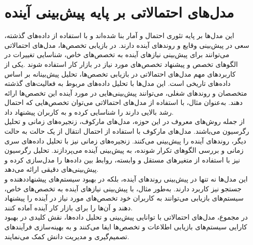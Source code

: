 \section{مدل‌های احتمالاتی بر پایه پیش‌بینی آینده}
\hspace*{2em}
این مدل‌ها بر پایه تئوری احتمال و آمار بنا شده‌اند و با استفاده از داده‌های گذشته، سعی در پیش‌بینی وقایع و روندهای آینده	  دارند. در بازیابی تخصص‌ها، مدل‌های احتمالاتی می‌توانند برای پیش‌بینی نیازهای آینده به تخصص‌های خاص، شناسایی تغییرات در الگوهای تخصص و پیشنهاد تخصص‌های مورد نیاز در بازار کار استفاده شوند .یکی از کاربردهای مهم مدل‌های احتمالاتی در بازیابی تخصص‌ها، تحلیل پیش‌بینانه بر اساس داده‌های تاریخی است. این مدل‌ها با تحلیل داده‌های مربوط به فعالیت‌های گذشته متخصصان و روندهای شغلی، می‌توانند پیش‌بینی‌هایی در مورد آینده این تخصص‌ها ارائه دهند. به‌عنوان مثال، با استفاده از مدل‌های احتمالاتی می‌توان تخصص‌هایی که احتمال رشد بالایی دارند را شناسایی کرده و به کاربران پیشنهاد داد.
\\
از جمله روش‌های معروف در این حوزه، مدل‌های مارکوف، زنجیره‌های زمانی و تحلیل رگرسیون می‌باشند. مدل‌های مارکوف با استفاده از احتمال انتقال از یک حالت به حالت دیگر، روندهای آینده را پیش‌بینی می‌کنند. زنجیره‌های زمانی نیز با تحلیل داده‌های سری زمانی و بررسی الگوهای تکرار شونده، به پیش‌بینی آینده می‌پردازند. تحلیل رگرسیون نیز با استفاده از متغیرهای مستقل و وابسته، روابط بین داده‌ها را مدل‌سازی کرده و پیش‌بینی‌های دقیقی ارائه می‌دهد.
\\
این مدل‌ها نه تنها در پیش‌بینی روندهای آینده، بلکه در بهبود سیستم‌های پیشنهاددهنده و جستجو نیز کاربرد دارند. به‌طور مثال، با پیش‌بینی نیازهای آینده به تخصص‌های خاص، سیستم‌های بازیابی می‌توانند به کاربران خود تخصص‌های مورد نیاز در آینده را پیشنهاد دهند و آن‌ها را برای بازار کار آینده آماده کنند.
\\
در مجموع، مدل‌های احتمالاتی با توانایی پیش‌بینی و تحلیل داده‌ها، نقش کلیدی در بهبود کارایی سیستم‌های بازیابی اطلاعات و تخصص‌ها ایفا می‌کنند و به بهینه‌سازی فرآیندهای تصمیم‌گیری و مدیریت دانش کمک می‌نمایند.

